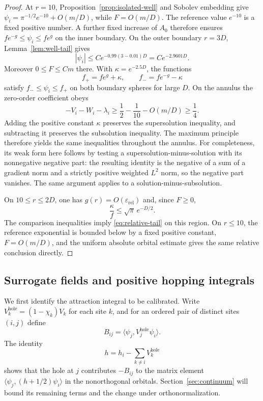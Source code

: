 \begin{proof}
At $r=10$, Proposition~\ref{prop:isolated-well} and Sobolev embedding
give $\psi_i=\pi^{-1/2}e^{-10}+O(m/D)$, while $F=O(m/D)$.
The reference value $e^{-10}$ is a fixed positive number.  A further
fixed increase of $A_0$ therefore ensures
$fe^{-g}\le\psi_i\le fe^g$ on the inner boundary.
On the outer boundary $r=3D$, Lemma~\ref{lem:well-tail} gives
\[
 |\psi_i|\le C e^{-0.99(3-0.01)D}=C e^{-2.9601D}.
\]
Moreover $0\le F\le Cm$ there.  With $\kappa=e^{-2.5D}$, the
functions
\[
 f_+=fe^g+\kappa,\qquad f_-=fe^{-g}-\kappa
\]
satisfy $f_-\le\psi_i\le f_+$ on both boundary spheres for large
$D$.  On the annulus the zero-order coefficient obeys
\[
 -V_i-W_i-\lambda_i
 \ge \frac12-\frac1{10}-O(m/D)\ge\frac14.
\]
Adding the positive constant $\kappa$ preserves the supersolution
inequality, and subtracting it preserves the subsolution inequality.
The maximum principle therefore yields the same inequalities throughout
the annulus.  For completeness, its weak form here follows by testing
a supersolution-minus-solution with its nonnegative negative part:
the resulting identity is the negative of a sum of a gradient norm
and a strictly positive weighted $L^2$ norm, so the negative part
vanishes.  The same argument applies to a solution-minus-subsolution.

On $10\le r\le2D$, one has
$g(r)=O(\varepsilon_{\mathrm{rel}})$ and, since $F\ge0$,
\[
 \frac{\kappa}{f}\le \sqrt\pi\,e^{-D/2}.
\]
The comparison inequalities imply \eqref{eq:relative-tail} on this
region.  On $r\le10$, the reference exponential is bounded below by
a fixed positive constant, $F=O(m/D)$, and the uniform absolute
orbital estimate gives the same relative conclusion directly.
\end{proof}

\subsection{Surrogate fields and positive hopping integrals}

We first identify the attraction integral to be calibrated. Write
$V_k^{\mathrm{hole}}=(1-\chi_k)V_k$ for each site $k$, and for an
ordered pair of distinct sites $(i,j)$ define
\begin{equation}
 B_{ij}=\langle\psi_j,V_j^{\mathrm{hole}}\psi_i\rangle.
 \label{eq:oriented-hole-integral}
\end{equation}
The identity
\[
 h=h_i-\sum_{k\ne i}V_k^{\mathrm{hole}}
\]
shows that the hole at $j$ contributes $-B_{ij}$ to the matrix
element $\langle\psi_j,(h+1/2)\psi_i\rangle$ in the nonorthogonal
orbitals. Section~\ref{sec:continuum} will bound its remaining terms
and the change under orthonormalization.

